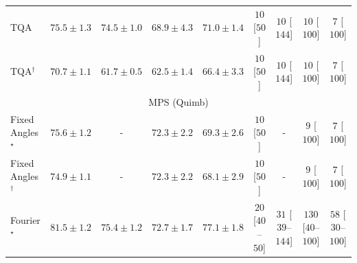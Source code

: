 \begin{tabular}{l|cccc|cccc|}
TQA & {\cellcolor[HTML]{894CA2}} \color[HTML]{F1F1F1} $75.5\pm 1.3$ & {\cellcolor[HTML]{8A5AA9}} \color[HTML]{F1F1F1} $74.5\pm 1.0$ & {\cellcolor[HTML]{96ABD1}} \color[HTML]{F1F1F1} $68.9\pm 4.3$ & {\cellcolor[HTML]{8C8FC2}} \color[HTML]{F1F1F1} $71.0\pm 1.4$ & {\cellcolor[HTML]{FFF7F3}} \color[HTML]{000000} $10$ [$50$] & {\cellcolor[HTML]{FFF7F3}} \color[HTML]{000000} $10$ [$144$] & {\cellcolor[HTML]{FFF7F3}} \color[HTML]{000000} $10$ [$100$] & {\cellcolor[HTML]{FFF7F3}} \color[HTML]{000000} $7$ [$100$] \\
TQA$^\dagger$ & {\cellcolor[HTML]{8C93C4}} \color[HTML]{F1F1F1} $70.7\pm 1.1$ & {\cellcolor[HTML]{E1EDF5}} \color[HTML]{000000} $61.7\pm 0.5$ & {\cellcolor[HTML]{DAE7F1}} \color[HTML]{000000} $62.5\pm 1.4$ & {\cellcolor[HTML]{ACC6DF}} \color[HTML]{000000} $66.4\pm 3.3$ & {\cellcolor[HTML]{FFF7F3}} \color[HTML]{000000} $10$ [$50$] & {\cellcolor[HTML]{FFF7F3}} \color[HTML]{000000} $10$ [$144$] & {\cellcolor[HTML]{FFF7F3}} \color[HTML]{000000} $10$ [$100$] & {\cellcolor[HTML]{FFF7F3}} \color[HTML]{000000} $7$ [$100$] \\
\cline{1-9}
\multicolumn{9}{c}{\rule{0pt}{8pt}MPS (Quimb)} \\
\midrule
Fixed Angles$^\star$ & {\cellcolor[HTML]{D35406}} \color[HTML]{F1F1F1} $75.6\pm 1.2$ & {\cellcolor[HTML]{000000}} \color[HTML]{F1F1F1} {\cellcolor{white}} \color{black} - & {\cellcolor[HTML]{F27F1B}} \color[HTML]{F1F1F1} $72.3\pm 2.2$ & {\cellcolor[HTML]{FEAB39}} \color[HTML]{000000} $69.3\pm 2.6$ & {\cellcolor[HTML]{FFF7F3}} \color[HTML]{000000} $10$ [$50$] & {\cellcolor[HTML]{000000}} \color[HTML]{F1F1F1} {\cellcolor{white}} \color{black} - & {\cellcolor[HTML]{FFF7F3}} \color[HTML]{000000} $9$ [$100$] & {\cellcolor[HTML]{FFF7F3}} \color[HTML]{000000} $7$ [$100$] \\
Fixed Angles$^\dagger$ & {\cellcolor[HTML]{DB5D0B}} \color[HTML]{F1F1F1} $74.9\pm 1.1$ & {\cellcolor[HTML]{000000}} \color[HTML]{F1F1F1} {\cellcolor{white}} \color{black} - & {\cellcolor[HTML]{F27F1B}} \color[HTML]{F1F1F1} $72.3\pm 2.2$ & {\cellcolor[HTML]{FEBD49}} \color[HTML]{000000} $68.1\pm 2.9$ & {\cellcolor[HTML]{FFF7F3}} \color[HTML]{000000} $10$ [$50$] & {\cellcolor[HTML]{000000}} \color[HTML]{F1F1F1} {\cellcolor{white}} \color{black} - & {\cellcolor[HTML]{FFF7F3}} \color[HTML]{000000} $9$ [$100$] & {\cellcolor[HTML]{FFF7F3}} \color[HTML]{000000} $7$ [$100$] \\
Fourier$^\star$ & {\cellcolor[HTML]{6E2706}} \color[HTML]{F1F1F1} $81.5\pm 1.2$ & {\cellcolor[HTML]{D55607}} \color[HTML]{F1F1F1} $75.4\pm 1.2$ & {\cellcolor[HTML]{F07919}} \color[HTML]{F1F1F1} $72.7\pm 1.7$ & {\cellcolor[HTML]{BC4503}} \color[HTML]{F1F1F1} $77.1\pm 1.8$ & {\cellcolor[HTML]{FFF4F0}} \color[HTML]{000000} $20$ [$40$--$50$] & {\cellcolor[HTML]{FFF2EE}} \color[HTML]{000000} $31$ [$39$--$144$] & {\cellcolor[HTML]{FDDBD7}} \color[HTML]{000000} $130$ [$40$--$100$] & {\cellcolor[HTML]{FEECE9}} \color[HTML]{000000} $58$ [$30$--$100$] \\

\end{tabular}
